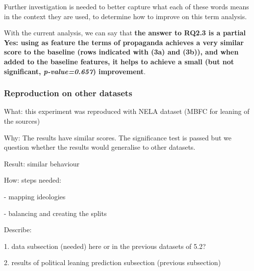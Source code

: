 Further investigation is needed to better capture what each of these words means in the context they are used, to determine how to improve on this term analysis.%

With the current analysis, we can say that \textbf{the answer to RQ2.3 is a partial Yes: using as feature the terms of propaganda achieves a very similar score to the baseline (rows indicated with (3a) and (3b)), and when added to the baseline features, it helps to achieve a small (but not significant, \textit{p-value=0.657}) improvement}. %


\subsubsection{\statusred Reproduction on other datasets}

What: this experiment was reproduced with NELA dataset (MBFC for leaning of the sources)

Why: The results have similar scores. The significance test is passed but we question whether the results would generalise to other datasets.

Result: similar behaviour


How: steps needed:

- mapping ideologies

- balancing and creating the splits

Describe:

1. data subsection (needed) here or in the previous datasets of 5.2?

2. results of political leaning prediction subsection (previous subsection)


